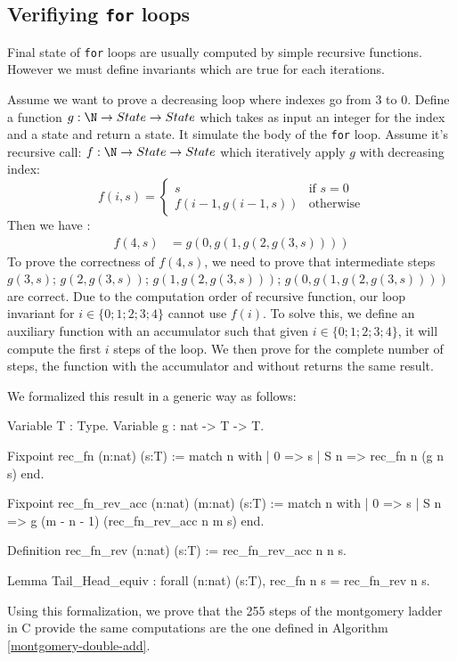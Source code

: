 \subsection{Verifiying \texttt{for} loops}

Final state of \texttt{for} loops are usually computed by simple recursive functions.
However we must define invariants which are true for each iterations.

Assume we want to prove a decreasing loop where indexes go from 3 to 0.
Define a function $g : \N \rightarrow State  \rightarrow State $ which takes as input an integer for the index and a state and return a state.
It simulate the body of the \texttt{for} loop.
Assume it's recursive call: $f : \N \rightarrow State \rightarrow State $ which iteratively apply $g$ with decreasing index:
\begin{equation*}
  f ( i , s ) =
  \begin{cases}
  s & \text{if } s = 0 \\
  f( i - 1 , g ( i - 1  , s )) & \text{otherwise}
  \end{cases}
\end{equation*}
Then we have :
\begin{align*}
  f(4,s) &= g(0,g(1,g(2,g(3,s))))
\end{align*}
To prove the correctness of $f(4,s)$, we need to prove that intermediate steps
$g(3,s)$; $g(2,g(3,s))$; $g(1,g(2,g(3,s)))$; $g(0,g(1,g(2,g(3,s))))$ are correct.
Due to the computation order of recursive function, our loop invariant for $i\in\{0;1;2;3;4\}$ cannot use $f(i)$.
To solve this, we define an auxiliary function with an accumulator such that given $i\in\{0;1;2;3;4\}$, it will compute the first $i$ steps of the loop.
We then prove for the complete number of steps, the function with the accumulator and without returns the same result.

We formalized this result in a generic way as follows:
\begin{Coq}
Variable T : Type.
Variable g : nat -> T -> T.

Fixpoint rec_fn (n:nat) (s:T) :=
  match n with
  | 0 => s
  | S n => rec_fn n (g n s)
  end.

Fixpoint rec_fn_rev_acc (n:nat) (m:nat) (s:T) :=
  match n with
  | 0 => s
  | S n => g (m - n - 1) (rec_fn_rev_acc n m s)
  end.

Definition rec_fn_rev (n:nat) (s:T) :=
  rec_fn_rev_acc n n s.

Lemma Tail_Head_equiv :
  forall (n:nat) (s:T),
  rec_fn n s = rec_fn_rev n s.
\end{Coq}
Using this formalization, we prove that the 255 steps of the montgomery ladder in C provide the same computations are the one defined in Algorithm \ref{montgomery-double-add}.

